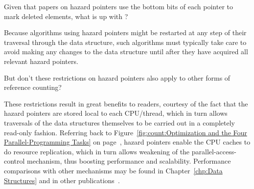 \QuickQuiz{}
	Given that papers on hazard pointers use the bottom bits
	of each pointer to mark deleted elements, what is up with
	?
 \QuickQuizEnd

Because algorithms using hazard pointers might be restarted at any
step of their traversal through the data structure, such algorithms
must typically take care to avoid making any changes to the data
structure until after they have acquired all relevant hazard pointers.

\QuickQuiz{}
	But don't these restrictions on hazard pointers also apply
	to other forms of reference counting?
 \QuickQuizEnd

These restrictions result in great benefits to readers, courtesy of the
fact that the hazard pointers are stored local to each CPU/thread,
which in turn allows traversals of the data structures themselves to
be carried out in a completely read-only fashion.
Referring back to
Figure~\ref{fig:count:Optimization and the Four Parallel-Programming Tasks}
on
page~\pageref{fig:count:Optimization and the Four Parallel-Programming Tasks},
hazard pointers enable the CPU caches to do resource replication, which
in turn allows weakening of the parallel-access-control mechanism,
thus boosting performance and scalability.
Performance comparisons with other mechanisms may be found in
Chapter~\ref{chp:Data Structures}
and in other publications~\cite{ThomasEHart2007a,McKenney:2013:SDS:2483852.2483867,MagedMichael04a}.

